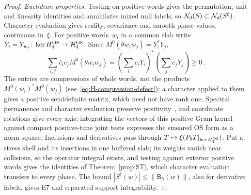 \begin{proof}
\emph{Euclidean properties.} Testing on positive words gives the permutation, unit and linearity identities and annihilates mixed null labels, so $\mathcal{N}_{d}(S)\subset\mathcal{N}_{d}(S^\xi)$. Character evaluation gives reality, covariance and smooth phase values, continuous in~$\xi$. For positive words~$w_i$ in a common slab write $Y_i=Y_{w_i}\colon\ker H_4^{\rm OS}\to\mathcal H_4^{\rm OS}$. Since $M^0(\theta w_iw_j)=Y_i^*Y_j$,
\begin{equation*}
\sum_{i,j}\bar c_ic_jM^0(\theta w_iw_j)=\left(\sum_i c_iY_i\right)^*\left(\sum_jc_jY_j\right)\ge0\,.
\end{equation*}
The entries are compressions of whole words, not the products $M^0(w_i)^*M^0(w_j)$ (see~\eqref{eq:H-compression-defect}); a character applied to them gives a positive semidefinite matrix, which need not have rank one. Spectral permanence and character evaluation preserve positivity~\cite[Theorems~2.5.1(1) and~2.6.4]{Landsman1998}, and coordinate rotations give every axis; integrating the vectors of this positive Gram kernel against compact positive-time joint tests expresses the smeared OS form as a norm square. Inclusions and derivatives pass through $T\mapsto\xi(P_0T|_{\ker H_4^{\rm OS}})$. Put a stress shell and its insertions in one buffered slab; its weights vanish near collisions, so the operator integral exists, and testing against exterior positive words gives the identities of Theorem~\ref{prop:ST}, which character evaluation transfers to every phase. The bound $|S^\xi(w)|\le\|\mathsf B_h(w)\|$, also for derivative labels, gives E7 and separated-support integrability.


\end{proof}
